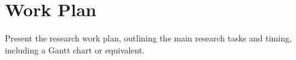 \chapter{Work Plan}
Present the research work plan, outlining the main research tasks and timing, including a Gantt chart or equivalent. 